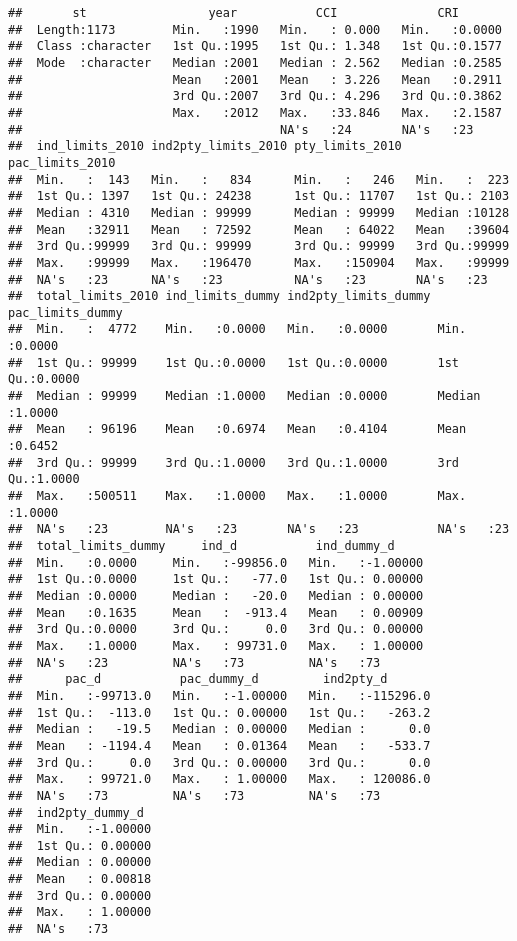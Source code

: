 \documentclass[]{article}
\begin{document}
\begin{verbatim}
##       st                 year           CCI              CRI        
##  Length:1173        Min.   :1990   Min.   : 0.000   Min.   :0.0000  
##  Class :character   1st Qu.:1995   1st Qu.: 1.348   1st Qu.:0.1577  
##  Mode  :character   Median :2001   Median : 2.562   Median :0.2585  
##                     Mean   :2001   Mean   : 3.226   Mean   :0.2911  
##                     3rd Qu.:2007   3rd Qu.: 4.296   3rd Qu.:0.3862  
##                     Max.   :2012   Max.   :33.846   Max.   :2.1587  
##                                    NA's   :24       NA's   :23      
##  ind_limits_2010 ind2pty_limits_2010 pty_limits_2010  pac_limits_2010
##  Min.   :  143   Min.   :   834      Min.   :   246   Min.   :  223  
##  1st Qu.: 1397   1st Qu.: 24238      1st Qu.: 11707   1st Qu.: 2103  
##  Median : 4310   Median : 99999      Median : 99999   Median :10128  
##  Mean   :32911   Mean   : 72592      Mean   : 64022   Mean   :39604  
##  3rd Qu.:99999   3rd Qu.: 99999      3rd Qu.: 99999   3rd Qu.:99999  
##  Max.   :99999   Max.   :196470      Max.   :150904   Max.   :99999  
##  NA's   :23      NA's   :23          NA's   :23       NA's   :23     
##  total_limits_2010 ind_limits_dummy ind2pty_limits_dummy pac_limits_dummy
##  Min.   :  4772    Min.   :0.0000   Min.   :0.0000       Min.   :0.0000  
##  1st Qu.: 99999    1st Qu.:0.0000   1st Qu.:0.0000       1st Qu.:0.0000  
##  Median : 99999    Median :1.0000   Median :0.0000       Median :1.0000  
##  Mean   : 96196    Mean   :0.6974   Mean   :0.4104       Mean   :0.6452  
##  3rd Qu.: 99999    3rd Qu.:1.0000   3rd Qu.:1.0000       3rd Qu.:1.0000  
##  Max.   :500511    Max.   :1.0000   Max.   :1.0000       Max.   :1.0000  
##  NA's   :23        NA's   :23       NA's   :23           NA's   :23      
##  total_limits_dummy     ind_d           ind_dummy_d      
##  Min.   :0.0000     Min.   :-99856.0   Min.   :-1.00000  
##  1st Qu.:0.0000     1st Qu.:   -77.0   1st Qu.: 0.00000  
##  Median :0.0000     Median :   -20.0   Median : 0.00000  
##  Mean   :0.1635     Mean   :  -913.4   Mean   : 0.00909  
##  3rd Qu.:0.0000     3rd Qu.:     0.0   3rd Qu.: 0.00000  
##  Max.   :1.0000     Max.   : 99731.0   Max.   : 1.00000  
##  NA's   :23         NA's   :73         NA's   :73        
##      pac_d           pac_dummy_d         ind2pty_d        
##  Min.   :-99713.0   Min.   :-1.00000   Min.   :-115296.0  
##  1st Qu.:  -113.0   1st Qu.: 0.00000   1st Qu.:   -263.2  
##  Median :   -19.5   Median : 0.00000   Median :      0.0  
##  Mean   : -1194.4   Mean   : 0.01364   Mean   :   -533.7  
##  3rd Qu.:     0.0   3rd Qu.: 0.00000   3rd Qu.:      0.0  
##  Max.   : 99721.0   Max.   : 1.00000   Max.   : 120086.0  
##  NA's   :73         NA's   :73         NA's   :73         
##  ind2pty_dummy_d   
##  Min.   :-1.00000  
##  1st Qu.: 0.00000  
##  Median : 0.00000  
##  Mean   : 0.00818  
##  3rd Qu.: 0.00000  
##  Max.   : 1.00000  
##  NA's   :73
\end{verbatim}
\end{document}
